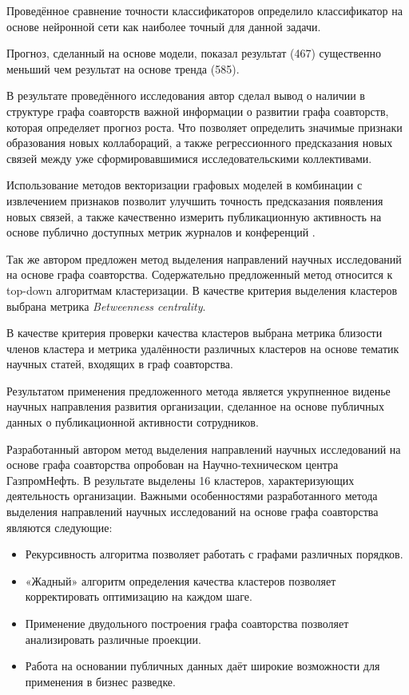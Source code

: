 Проведённое сравнение точности классификаторов определило классификатор на основе нейронной сети как наиболее точный для данной задачи. 

Прогноз, сделанный на основе модели, показал результат (467) существенно меньший чем результат на основе тренда (585). 

В результате проведённого исследования автор сделал вывод о наличии в структуре графа соавторств важной информации о развитии графа соавторств, которая определяет прогноз роста. Что позволяет определить значимые признаки образования новых коллабораций, а также регрессионного предсказания новых связей между уже сформировавшимися исследовательскими коллективами. 

Использование методов векторизации графовых моделей в комбинации с извлечением признаков позволит улучшить точность предсказания появления новых связей, а также качественно измерить публикационную активность на основе публично доступных метрик журналов и конференций .

Так же автором предложен метод выделения направлений научных исследований на основе графа соавторства. Содержательно предложенный метод относится к top-down алгоритмам кластеризации. В качестве критерия выделения кластеров выбрана метрика \textit{Betweenness centrality}. 

В качестве критерия проверки качества кластеров выбрана метрика близости членов кластера и метрика удалённости различных кластеров на основе тематик научных статей, входящих в граф соавторства. 

Результатом применения предложенного метода является укрупненное виденье научных направления развития организации, сделанное на основе публичных данных о публикационной активности сотрудников.

Разработанный автором метод выделения направлений научных исследований на основе графа соавторства опробован на Научно-техническом центра ГазпромНефть. В результате выделены 16 кластеров, характеризующих деятельность организации.
Важными особенностями разработанного метода выделения направлений научных исследований на основе графа соавторства являются следующие:

\begin{itemize}
\tightlist
\item Рекурсивность алгоритма позволяет работать с графами различных порядков.
\item «Жадный» алгоритм определения качества кластеров позволяет корректировать оптимизацию на каждом шаге.
\item Применение двудольного построения графа соавторства позволяет анализировать различные проекции.
\item Работа на основании публичных данных даёт широкие возможности для применения в бизнес разведке.
\end{itemize}

